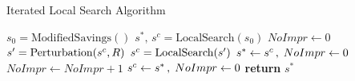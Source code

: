 \begin{algorithm}[ht]
    \caption{Iterated Local Search Algorithm}\label{alg:principal_ILS}
    \begin{algorithmic}[1]
        \State $s_0 = \text{ModifiedSavings}()$ 
        \State $s^*,\,s^c = \text{LocalSearch}(s_0)$
        \State $NoImpr \leftarrow 0$
        \State $s\sp{\prime}  = \text{Perturbation}(s^c,R)$ 
        \State $s\sp{c} = \text{LocalSearch}(s\sp{\prime})$
         
        \State $s^* \gets s\sp{c}\,,\;NoImpr \gets 0$
        \Else
        \State $NoImpr \gets NoImpr + 1$
        \State $s^c \gets s\sp{*}\,,\;NoImpr \gets 0$ 
        \EndIf
        \EndIf
        \EndWhile
        \State \textbf{return} $s^*$
        \EndProcedure
    \end{algorithmic}
\end{algorithm}
